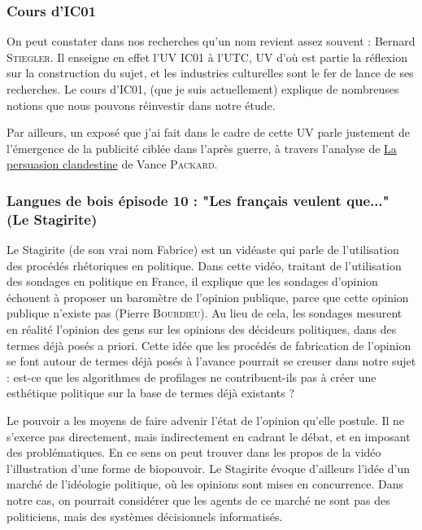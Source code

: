 \documentclass[a4paper,10pt]{article}
\begin{document}
\subsubsection{Cours d'IC01}

On peut constater dans nos recherches qu'un nom revient assez souvent : Bernard \textsc{Stiegler}. Il enseigne en effet l'UV IC01 à l'UTC, UV d'où est partie la réflexion sur la construction du sujet, et les industries culturelles sont le fer de lance de ses recherches. Le cours d'IC01, (que je suis actuellement) explique de nombreuses notions que nous pouvons réinvestir dans notre étude.

Par ailleurs, un exposé que j'ai fait dans le cadre de cette UV parle justement de l'émergence de la publicité ciblée dans l'après guerre, à travers l'analyse de \underline{La persuasion clandestine} de Vance \textsc{Packard}.

\subsubsection{Langues de bois épisode 10 : "Les français veulent que..." (Le Stagirite)}

Le Stagirite (de son vrai nom Fabrice) est un vidéaste qui parle de l'utilisation des procédés rhétoriques en politique. Dans cette vidéo, traitant de l'utilisation des sondages en politique en France, il explique que les sondages d'opinion échouent à proposer un baromètre de l'opinion publique, parce que cette opinion publique n'existe pas (Pierre \textsc{Bourdieu}). Au lieu de cela, les sondages mesurent en réalité l'opinion des gens sur les opinions des décideurs politiques, dans des termes déjà posés a priori. Cette idée que les procédés de fabrication de l'opinion se font autour de termes déjà posés à l'avance pourrait se creuser dans notre sujet : est-ce que les algorithmes de profilages ne contribuent-ils pas à créer une esthétique politique sur la base de termes déjà existants ?

Le pouvoir a les moyens de faire advenir l'état de l'opinion qu'elle postule. Il ne s'exerce pas directement, mais indirectement en cadrant le débat, et en imposant des problématiques. En ce sens on peut trouver dans les propos de la vidéo l'illustration d'une forme de biopouvoir. Le Stagirite évoque d'ailleurs l'idée d'un marché de l'idéologie politique, où les opinions sont mises en concurrence. Dans notre cas, on pourrait considérer que les agents de ce marché ne sont pas des politiciens, mais des systèmes décisionnels informatisés.
\end{document}

